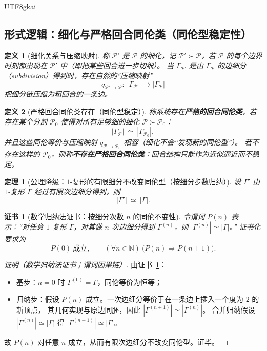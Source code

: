\documentclass[12pt]{article}
\newtheorem{definition}{定义}[section]
\newtheorem{theorem}{定理}[section]
\newtheorem{Certificate}{证书}[section]
\newcommand{\NN}{\mathbb{N}}
\begin{document}
\begin{CJK*}{UTF8}{gkai}
\subsection{形式逻辑：细化与严格回合同伦类（同伦型稳定性）}
\label{sec:round-refinement-strict-homotopy}

\begin{definition}[细化关系与压缩映射]
\label{def:round-refinement}
称 $\mathcal{P}'$ 是 $\mathcal{P}$ 的细化，记 $\mathcal{P}'\succ \mathcal{P}$，若 $\mathcal{P}$ 的每个边界时刻都出现在 $\mathcal{P}'$
  中（即把某些回合进一步切细）。
当 $\Gamma_{\mathcal{P}'}$ 是由 $\Gamma_{\mathcal{P}}$ 的边细分（subdivision）得到时，存在自然的“压缩映射”
\[
  q_{\mathcal{P}'\to \mathcal{P}}:\ |\Gamma_{\mathcal{P}'}|\to |\Gamma_{\mathcal{P}}|
\]
把细分链压缩为粗回合的一条边。
\end{definition}

\begin{definition}[严格回合同伦类存在（同伦型稳定）]
\label{def:strict-round-homotopy-class-exists}
称系统存在\textbf{严格的回合同伦类}，若存在某个分割 $\mathcal{P}_0$ 使得对所有足够细的细化 $\mathcal{P}\succ \mathcal{P}_0$：
\[
  |\Gamma_{\mathcal{P}}|\ \simeq\ |\Gamma_{\mathcal{P}_0}|,
\]
并且这些同伦等价与压缩映射 $q_{\mathcal{P}\to\mathcal{P}_0}$ 相容（细化不会“发现新的同伦型”）。
若不存在这样的 $\mathcal{P}_0$，则称\textbf{不存在严格回合同伦类}：回合结构只能作为近似逼近而不稳定。
\end{definition}

\begin{theorem}[公理降级：$1$-复形的有限细分不改变同伦型（按细分步数归纳）]
\label{thm:round-subdivision-homotopy-invariant}
设 $\Gamma'$ 由 $1$-复形 $\Gamma$ 经过有限次边细分得到，则
\[
  |\Gamma'|\ \simeq\ |\Gamma|.
\]
\end{theorem}

\begin{Certificate}[数学归纳法证书：按细分次数 $n$ 的同伦不变性]
\label{cert:round-subdivision-homotopy-invariant}
令谓词 $P(n)$ 表示：“对任意 $1$-复形 $\Gamma$，对其做 $n$ 次边细分得到 $\Gamma^{(n)}$，则 $|\Gamma^{(n)}|\simeq |\Gamma|$。”
证书化要求为
\[
  P(0)\ \text{成立},\qquad (\forall n\in\NN)\ \bigl(P(n)\Rightarrow P(n+1)\bigr).
\]
\end{Certificate}

\begin{proof}[证明（数学归纳法证书；谓词因果链）]
由证书~\ref{cert:round-subdivision-homotopy-invariant}：
\begin{itemize}
  \item 基步：$n=0$ 时 $\Gamma^{(0)}=\Gamma$，同伦等价为恒等；
  \item 归纳步：假设 $P(n)$ 成立。一次边细分等价于在一条边上插入一个度为 $2$ 的新顶点，
  其几何实现与原边同胚，因此 $|\Gamma^{(n+1)}|\simeq |\Gamma^{(n)}|$。
  合并归纳假设 $|\Gamma^{(n)}|\simeq |\Gamma|$ 得 $|\Gamma^{(n+1)}|\simeq |\Gamma|$。
\end{itemize}
故 $P(n)$ 对任意 $n$ 成立，从而有限次边细分不改变同伦型。证毕。
\end{proof}


\end{CJK*}
\end{document}
